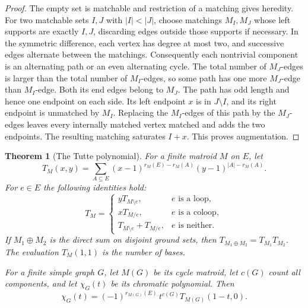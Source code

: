 \documentclass[11pt,oneside,openany]{book}
\theoremstyle{plain}
\newtheorem{theorem}{Theorem}[chapter]
\theoremstyle{definition}
\theoremstyle{remark}
\begin{document}
\begin{proof}
The empty set is matchable and restriction of a matching
gives heredity. For two matchable sets \(I,J\) with
\(|I|<|J|\), choose matchings \(M_I,M_J\) whose left supports
are exactly \(I,J\), discarding edges outside those
supports if necessary. In the symmetric difference,
each vertex has degree at most two, and successive edges
alternate between the matchings. Consequently each
nontrivial component is an alternating path or an even
alternating cycle. The total number of \(M_J\)-edges is
larger than the total number of \(M_I\)-edges, so some path
has one more \(M_J\)-edge than \(M_I\)-edge. Both its end
edges belong to \(M_J\). The path has odd length and hence
one endpoint on each side. Its left endpoint \(x\) is
in \(J\setminus I\), and its right endpoint is unmatched
by \(M_I\). Replacing the \(M_I\)-edges of this path by
the \(M_J\)-edges leaves every internally matched vertex
matched and adds the two endpoints. The resulting matching
saturates \(I+x\). This proves augmentation.
\end{proof}

\begin{theorem}[The Tutte polynomial]
\label{p204:W77}
For a finite matroid \(M\) on \(E\), let
\[
 T_M(x,y)=\sum_{A\subseteq E}
  (x-1)^{r_M(E)-r_M(A)}(y-1)^{|A|-r_M(A)} .
\]
For \(e\in E\) the following identities hold:
\[
 T_M=
 \begin{cases}
   yT_{M\setminus e},& e\text{ is a loop},\\
   xT_{M/e},& e\text{ is a coloop},\\
   T_{M\setminus e}+T_{M/e},& e\text{ is neither}.
 \end{cases}
\]
If \(M_1\oplus M_2\) is the direct sum on disjoint ground
sets, then \(T_{M_1\oplus M_2}=T_{M_1}T_{M_2}\).
The evaluation \(T_M(1,1)\) is the number of bases.

For a finite simple graph \(G\), let \(M(G)\) be its cycle
matroid, let \(c(G)\) count all components, and let
\(\chi_G(t)\) be its chromatic polynomial. Then
\[
 \chi_G(t)
   =(-1)^{r_{M(G)}(E)}\,t^{c(G)}T_{M(G)}(1-t,0).
\]
\end{theorem}
\end{document}
